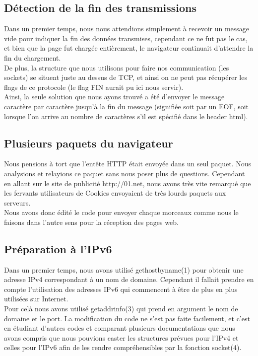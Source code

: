 \documentclass{scrreprt}
\begin{document}
\subsection{Détection de la fin des transmissions}
Dans un premier temps, nous nous attendions simplement à recevoir un message vide pour indiquer la fin des données transmises, cependant ce ne fut pas le cas, et bien que la page fut chargée entièrement, le navigateur continuait d'attendre la fin du chargement. \\
De plus, la structure que nous utilisons pour faire nos communication (les sockets) se situent juste au dessus de TCP, et ainsi on ne peut pas récupérer les flags de ce protocole (le flag FIN aurait pu ici nous servir).\\
Ainsi, la seule solution que nous ayons trouvé a été d'envoyer le message caractère par caractère jusqu'à la fin du message (signifiée soit par un EOF, soit lorsque l'on arrive au nombre de caractères s'il est spécifié dans le header html).

\subsection{Plusieurs paquets du navigateur}
Nous pensions à tort que l'entête HTTP était envoyée dans un seul paquet. Nous analysions et relayions ce paquet sans nous poser plus de questions. Cependant en allant sur le site de publicité http://01.net, nous avons très vite remarqué que les fervants utilisateurs de Cookies envoyaient de très lourds paquets aux serveurs.\\
Nous avons donc édité le code pour envoyer chaque morceaux comme nous le faisons dans l'autre sens pour la réception des pages web.

\subsection{Préparation à l'IPv6}
Dans un premier temps, nous avons utilisé gethostbyname(1) pour obtenir une adresse IPv4 correspondant à un nom de domaine. Cependant il fallait prendre en compte l'utilisation des adresses IPv6 qui commencent à être de plus en plus utilisées sur Internet.\\
Pour celà nous avons utilisé getaddrinfo(3) qui prend en argument le nom de domaine et le port. La modification du code ne s'est pas faite facilement, et c'est en étudiant d'autres codes et comparant plusieurs documentations que nous avons compris que nous pouvions caster les structures prévues pour l'IPv4 et celles pour l'IPv6 afin de les rendre compréhensibles par la fonction socket(4).
\end{document}
